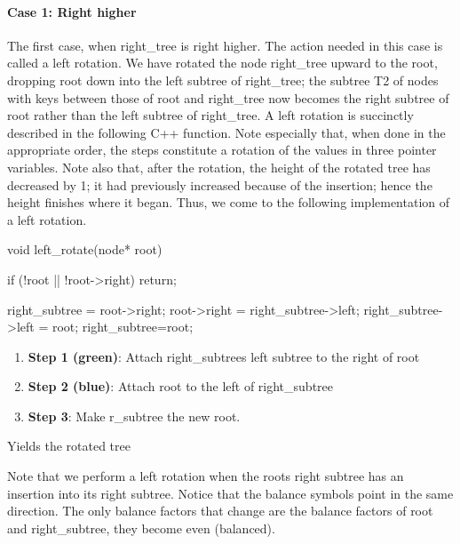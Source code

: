 \documentclass{report}
\begin{document}
\paragraph{Case 1: Right higher}
\bigbreak \noindent 
The first case, when right\_tree is right higher. The action needed in this case is called a left rotation.
We have rotated the node right\_tree
upward to the root, dropping root down into the left subtree of right\_tree; the subtree T2 of nodes with keys between those of root and right\_tree now becomes the
right subtree of root rather than the left subtree of right\_tree. A left rotation is
succinctly described in the following C++ function. Note especially that, when
done in the appropriate order, the steps constitute a rotation of the values in three
pointer variables. Note also that, after the rotation, the height of the rotated tree
has decreased by 1; it had previously increased because of the insertion; hence the
height finishes where it began.
\bigbreak \noindent 
{}
\bigbreak \noindent 
Thus, we come to the following implementation of a left rotation.
\bigbreak \noindent 
\begin{cppcode}
    void left_rotate(node* root) {
        if (!root || !root->right) return;
        
        right_subtree = root->right;
        root->right = right_subtree->left;
        right_subtree->left = root;
        right_subtree=root;
    }
\end{cppcode}
\pagebreak \bigbreak \noindent 
\begin{figure}[ht]
    \centering
    \label{fig:tr2}
\end{figure}
\bigbreak \noindent 
\begin{enumerate}
    \item \textbf{Step 1 (green)}: Attach right\_subtrees left subtree to the right of root
    \item \textbf{Step 2 (blue)}: Attach root to the left of right\_subtree
    \item \textbf{Step 3}: Make r\_subtree the new root.
\end{enumerate}
Yields the rotated tree
\bigbreak \noindent 
\begin{figure}[ht]
    \centering
    \label{fig:tr4}
\end{figure}
\bigbreak \noindent 
Note that we perform a left rotation when the roots right subtree has an insertion into its right subtree. Notice that the balance symbols point in the same direction. The only balance factors that change are the balance factors of root and right\_subtree, they become even (balanced).
\end{document}
